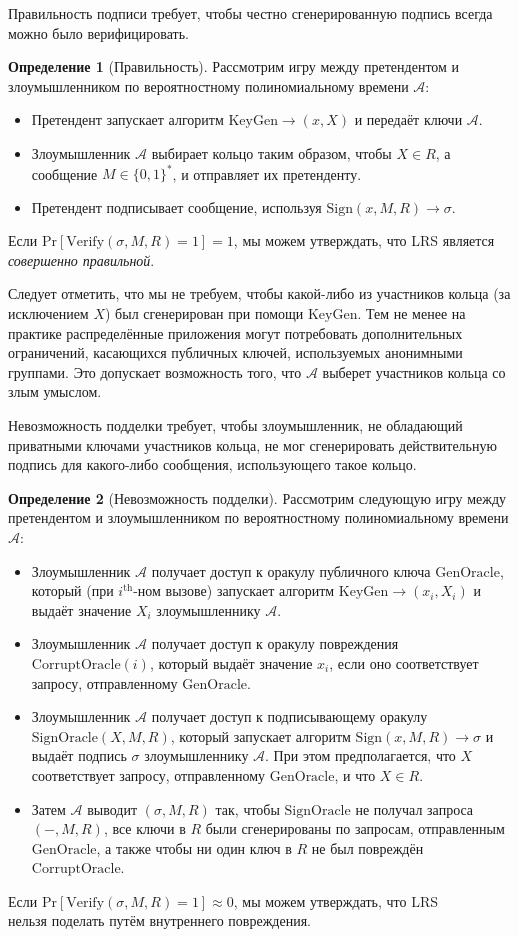 \documentclass{article}
\newcommand{\A}{\mathcal{A}}
\theoremstyle{definition}
\newtheorem{definition}{Определение}
\begin{document}
Правильность подписи требует, чтобы честно сгенерированную подпись всегда можно было верифицировать.
\begin{definition}[Правильность]
Рассмотрим игру между претендентом и злоумышленником по вероятностному полиномиальному времени $\A$:
\begin{itemize}
\item Претендент запускает алгоритм $\text{KeyGen} \to (x,X)$ и передаёт ключи $\A$.
\item Злоумышленник $\A$ выбирает кольцо таким образом, чтобы $X \in R$, а сообщение $M \in \{0,1\}^*$, и отправляет их претенденту.
\item Претендент подписывает сообщение, используя $\text{Sign}(x,M,R) \to \sigma$.
\end{itemize}
Если $\text{Pr}[ \text{Verify}(\sigma,M,R) = 1 ] = 1$, мы можем утверждать, что LRS является \textit{совершенно правильной}.
\end{definition}
Следует отметить, что мы не требуем, чтобы какой-либо из участников кольца (за исключением $X$) был сгенерирован при помощи $\text{KeyGen}$.
Тем не менее на практике распределённые приложения могут потребовать дополнительных ограничений, касающихся публичных ключей, используемых анонимными группами.
Это допускает возможность того, что $\A$ выберет участников кольца со злым умыслом.

Невозможность подделки требует, чтобы злоумышленник, не обладающий приватными ключами участников кольца, не мог сгенерировать действительную подпись для какого-либо сообщения, использующего такое кольцо.
\begin{definition}[Невозможность подделки]
Рассмотрим следующую игру между претендентом и злоумышленником по вероятностному полиномиальному времени $\A$:
\begin{itemize}
\item Злоумышленник $\A$ получает доступ к оракулу публичного ключа $\text{GenOracle}$, который (при $i^\text{th}$-ном вызове) запускает алгоритм $\text{KeyGen} \to (x_i,X_i)$ и выдаёт значение $X_i$ злоумышленнику $\A$.
\item Злоумышленник $\A$ получает доступ к оракулу повреждения $\text{CorruptOracle}(i)$, который выдаёт значение $x_i$, если оно соответствует запросу, отправленному $\text{GenOracle}$.
\item Злоумышленник $\A$ получает доступ к подписывающему оракулу $\text{SignOracle}(X,M,R)$, который запускает алгоритм $\text{Sign}(x,M,R) \to \sigma$ и выдаёт подпись $\sigma$ злоумышленнику $\A$. При этом предполагается, что $X$ соответствует запросу, отправленному $\text{GenOracle}$, и что $X \in R$.
\item Затем $\A$ выводит $(\sigma,M,R)$ так, чтобы $\text{SignOracle}$ не получал запроса $(-,M,R)$, все ключи в $R$ были сгенерированы по запросам, отправленным $\text{GenOracle}$, а также чтобы ни один ключ в $R$ не был повреждён $\text{CorruptOracle}$.
\end{itemize}
Если $\text{Pr}[ \text{Verify}(\sigma,M,R) = 1 ] \approx 0$, мы можем утверждать, что LRS $\textit{нельзя поделать}$ путём внутреннего повреждения.
\end{definition}
\end{document}
